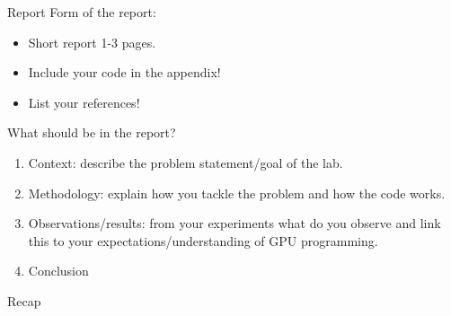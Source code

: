 \documentclass[11pt,t]{beamer}
\begin{document}
\begin{frame}{Report} 
    Form of the report:
    \begin{small}
        \begin{itemize}
            \item Short report 1-3 pages.
            \item Include your code in the appendix!
            \item List your references!
        \end{itemize}
        \end{small}
    What should be in the report?
    \begin{small}
    \begin{enumerate}
        \item Context: describe the problem statement/goal of the lab.
        \item Methodology: explain how you tackle the problem and how the code works.
        \item Observations/results: from your experiments what do you observe and link this to your expectations/understanding of GPU programming.
        \item Conclusion
    \end{enumerate}
    \end{small}
\end{frame}


\begin{frame}{Recap} 

    \vspace{-0.5cm}

    \begin{columns}[t] %
    \begin{figure}
    \centering
    \resizebox{0.95\columnwidth}{!}{}
    \end{figure}
    
    \begin{figure}
    \centering
    \resizebox{0.95\columnwidth}{!}{}
    \end{figure}
    \end{columns}
    
    \begin{columns}[t] %
    \begin{figure}
    \centering
    \resizebox{0.95\columnwidth}{!}{}
    \end{figure}
    
    \begin{figure}
    \centering
    \resizebox{0.95\columnwidth}{!}{}
    \end{figure}
    \end{columns}

\end{frame}
\end{document}
